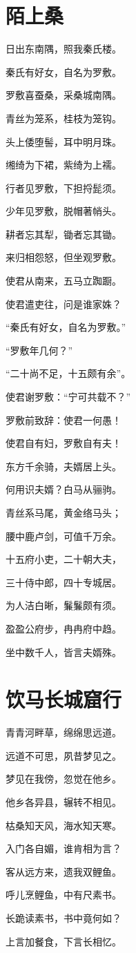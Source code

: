 \documentclass{article}
\begin{document}
\twocolumn  %

\section{陌上桑}

日出东南隅，照我秦氏楼。

秦氏有好女，自名为罗敷。

罗敷喜蚕桑，采桑城南隅。

青丝为笼系，桂枝为笼钩。

头上倭堕髻，耳中明月珠。

缃绮为下裙，紫绮为上襦。

行者见罗敷，下担捋髭须。

少年见罗敷，脱帽著帩头。

耕者忘其犁，锄者忘其锄。

来归相怨怒，但坐观罗敷。

使君从南来，五马立踟蹰。

使君遣吏往，问是谁家姝？

“秦氏有好女，自名为罗敷。”

“罗敷年几何？”

“二十尚不足，十五颇有余”。

使君谢罗敷：“宁可共载不？”

罗敷前致辞：使君一何愚！

使君自有妇，罗敷自有夫！

东方千余骑，夫婿居上头。

何用识夫婿？白马从骊驹。

青丝系马尾，黄金络马头；

腰中鹿卢剑，可值千万余。

十五府小吏，二十朝大夫，

三十侍中郎，四十专城居。

为人洁白晰，鬑鬑颇有须。

盈盈公府步，冉冉府中趋。

坐中数千人，皆言夫婿殊。

\newpage

\section{饮马长城窟行}

青青河畔草，绵绵思远道。

远道不可思，夙昔梦见之。

梦见在我傍，忽觉在他乡。

他乡各异县，辗转不相见。

枯桑知天风，海水知天寒。

入门各自媚，谁肯相为言？

客从远方来，遗我双鲤鱼。

呼儿烹鲤鱼，中有尺素书。

长跪读素书，书中竟何如？

上言加餐食，下言长相忆。
\end{document}
